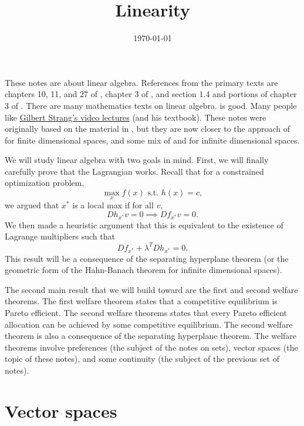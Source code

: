  


\title{Linearity}
\date{\today}



\maketitle

These notes are about linear algebra. References from the primary
texts are chapters 10, 11, and 27 of \cite{sb1994}, chapter 3 of
\cite{fuente2000}, and section 1.4 and portions of chapter 3 of
\cite{carter2001}. There are many mathematics texts on linear algebra.
\cite{axler1997} is good. Many people like
\href{http://ocw.mit.edu/courses/mathematics/18-06-linear-algebra-spring-2010/video-lectures/}
{Gilbert Strang's video lectures} (and his textbook). These notes were
originally based on the material in \cite{sb1994}, but they are now
closer to the approach of \cite{axler1997} for finite dimensional
spaces, and some mix of \cite{luenberger1969} and \cite{clarke2013}
for infinite dimensional spaces.

We will study linear algebra with two goals in mind. First, we will
finally carefully prove that the Lagrangian works. Recall that for a
constrained optimization problem, 
\[ \max_x f(x) \text{ s.t.  } h(x) = c, \]
we argued that $x^*$ is a local max if for all $v$, 
\[ Dh_{x^*} v = 0 \implies Df_{x^*} v = 0. \] 
We then made a heuristic argument that this is equivalent to the
existence of Lagrange multipliers such that 
\[ Df_{x^*} + \lambda^T Dh_{x^*} = 0. \]
This result will be a consequence of the separating hyperplane theorem
(or the geometric form of the Hahn-Banach theorem for infinite
dimensional spaces).

The second main result that we will build toward are the first and
second welfare theorems. The first welfare theorem states that a
competitive equilibrium is Pareto efficient. The second welfare
theorems states that every Pareto efficient allocation can be achieved
by some competitive equilibrium. The second welfare theorem is also a
consequence of the separating hyperplane theorem. The welfare theorems
involve preferences (the subject of the notes on sets), vector spaces
(the topic of these notes), and some continuity (the subject of the
previous set of notes).

\section{Vector spaces}

